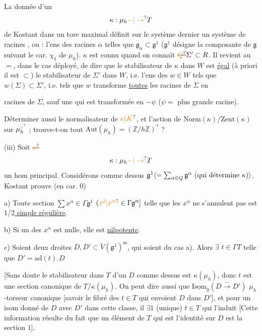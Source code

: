 La donnée d'un
\[
\kappa:\mu_h\unsure{-|\to}T
\]
de Kostant dans un tore maximal définit sur le système dernier un système de racines , ou  : l'ens des racines $\alpha$ telles que $\mathfrak g_{\alpha}\subset\mathfrak g^1$ ($\mathfrak g^1$ désigne la composante de $\mathfrak g$ suivant le car. $\chi_1$ de $\mu_h$).  $\kappa$ est connu quand on connaît $\deleted{\unsure{Q}}\Sigma'\subset R$.  Il revient au $=$, dans le cas déployé, de dire que le  stabilisateur de $\kappa$ dans $W$ est \uline{égal} (à priori il est $\subset$) le stabilisateur de $\Sigma'$ dans $W$, i.e. l'ens des $w\in W$ tels que $w(\Sigma)\subset\Sigma'$, i.e. tels que $w$ transforme \uline{toutes} les racines de $\Sigma$ en

racines de $\Sigma$, sauf une qui est transformée en $-\psi$ ($\psi=$ plus grande racine).

Déterminer aussi le normalisateur de $\unsure{\kappa|K}$, et l'action de $\mathrm{Norm}(\kappa)/\mathrm{Zent}(\kappa)$ sur $\mu^{\unsure{\circ}}_h$ ; trouve-t-on tout $\mathrm{Aut}(\mu_h)=(\mathbb Z/h\mathbb Z)^{*}$ ?

(iii) Soit $\deleted{\unsure{\kappa}}$
\[
\kappa:\mu_h\unsure{-|\to}T
\]
un hom principal. Considérons comme dessus ${\mathfrak g}^{1}\inserted{=\sum_{\alpha\in Q}\mathfrak g^{\alpha}\ \text{(qui détermine $\kappa$)}}$. Kostant prouve (en car. $0$)

a) Toute section $\sum x^{\alpha}\in\Gamma\mathfrak g^1$ $(\unsure{x^{2}|x^{\alpha}}\in\Gamma\mathfrak g^{\alpha}]$ telle que les $x^{\alpha}$ ne s'annulent pas est \uline{$1/2$ simple régulière}.

b) Si un des $x^{\alpha}$ est nulle, elle est \uline{nilpotente}.

c) Soient deux droites $D,D'\subset\check V(\mathfrak g^{1})^{\mathrm{ss}}$, qui soient du cas a). Alors $\exists$ $t\in\Gamma T$ telle que $D'=\mathrm{ad}(t).D$

[Sans doute le stabilisateur dans $T$ d'un $D$ comme dessus est $\kappa(\mu_h)$, donc $t$ est une section canonique de $T/\kappa(\mu_h)$. On peut dire aussi que  $\underline{\mathrm{Isom}}_{\underline{0}}(D\overset{\sim}{\to}D')$  $\mu_h$-torseur canonique [savoir  le fibré des $t\in T$ qui envoient $D$ dans $D'$], et pour un isom donné de $D$ avec $D'$ dans cette classe, il $\exists 1$ (unique) $t\in T$ qui l'induit [Cette information résulte du fait que un élément de $T$ qui est l'identité sur $D$ est la section $1$].

